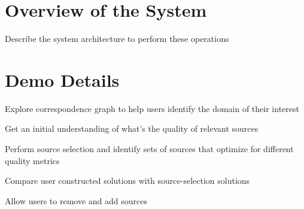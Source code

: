\documentclass{vldb}
\begin{document}
\section{Overview of the System}

Describe the system architecture to perform these operations

\section{Demo Details}

Explore correspondence graph to help users identify the domain of their interest

Get an initial understanding of what's the quality of relevant sources

Perform source selection and identify sets of sources that optimize for different
quality metrics

Compare user constructed solutions with source-selection solutions

Allow users to remove and add sources



\end{document}
